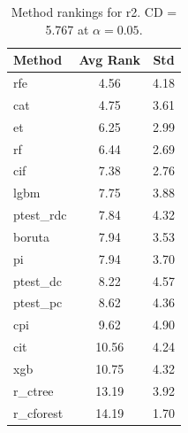 \begin{table}[h]
\centering
\caption{Method rankings for r2. CD = 5.767 at $\alpha=0.05$.}
\label{tab:ranks_r2}
\begin{tabular}{lcc}
\toprule
Method & Avg Rank & Std \\
\midrule
rfe & 4.56 & 4.18 \\
cat & 4.75 & 3.61 \\
et & 6.25 & 2.99 \\
rf & 6.44 & 2.69 \\
cif & 7.38 & 2.76 \\
lgbm & 7.75 & 3.88 \\
ptest_rdc & 7.84 & 4.32 \\
boruta & 7.94 & 3.53 \\
pi & 7.94 & 3.70 \\
ptest_dc & 8.22 & 4.57 \\
ptest_pc & 8.62 & 4.36 \\
cpi & 9.62 & 4.90 \\
cit & 10.56 & 4.24 \\
xgb & 10.75 & 4.32 \\
r_ctree & 13.19 & 3.92 \\
r_cforest & 14.19 & 1.70 \\
\bottomrule
\end{tabular}
\end{table}